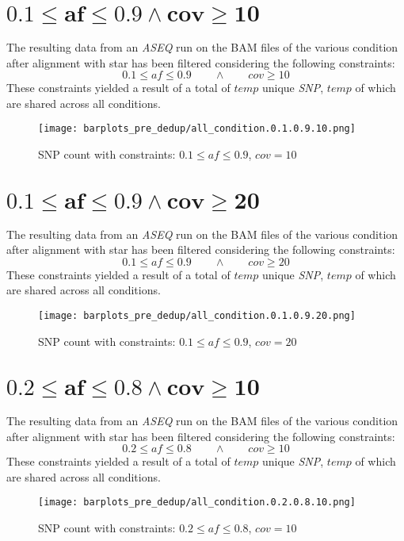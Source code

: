 \documentclass{article}
\begin{document}
\section*{$\mathbf{0.1\le af\le 0.9\land cov\ge 10}$}
The resulting data from an \emph{ASEQ} run on the BAM files of the various condition after alignment with star has been filtered considering the following constraints:
  $$0.1\le af\le 0.9\qquad\land\qquad cov\ge 10$$
	These constraints yielded a result of a total of $temp$ unique \emph{SNP}, $temp$ of which are shared across all conditions.
\begin{figure}[H]
  \texttt{[image: barplots\_pre\_dedup/all\_condition.0.1.0.9.10.png]}
\caption{SNP count with constraints: $0.1\le af \le 0.9$, $cov = 10$ }
\end{figure}


\section*{$\mathbf{0.1\le af\le 0.9\land cov\ge 20}$}
The resulting data from an \emph{ASEQ} run on the BAM files of the various condition after alignment with star has been filtered considering the following constraints:
  $$0.1\le af\le 0.9\qquad\land\qquad cov\ge 20$$
	These constraints yielded a result of a total of $temp$ unique \emph{SNP}, $temp$ of which are shared across all conditions.
\begin{figure}[H]
  \texttt{[image: barplots\_pre\_dedup/all\_condition.0.1.0.9.20.png]}
\caption{SNP count with constraints: $0.1\le af \le 0.9$, $cov = 20$ }
\end{figure}


\section*{$\mathbf{0.2\le af\le 0.8\land cov\ge 10}$}
The resulting data from an \emph{ASEQ} run on the BAM files of the various condition after alignment with star has been filtered considering the following constraints:
  $$0.2\le af\le 0.8\qquad\land\qquad cov\ge 10$$
	These constraints yielded a result of a total of $temp$ unique \emph{SNP}, $temp$ of which are shared across all conditions.
\begin{figure}[H]
  \texttt{[image: barplots\_pre\_dedup/all\_condition.0.2.0.8.10.png]}
\caption{SNP count with constraints: $0.2\le af \le 0.8$, $cov = 10$ }
\end{figure}

\end{document}
